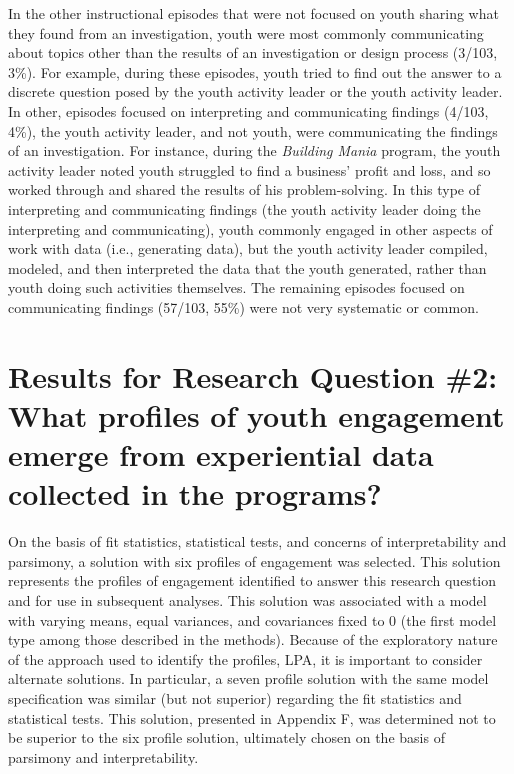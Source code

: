 \documentclass[]{msu-thesis}
\theoremstyle{definition}
\theoremstyle{definition}
\theoremstyle{definition}
\theoremstyle{remark}
\begin{document}
In the other instructional episodes that were not focused on youth
sharing what they found from an investigation, youth were most commonly
communicating about topics other than the results of an investigation or
design process (3/103, 3\%). For example, during these episodes, youth
tried to find out the answer to a discrete question posed by the youth
activity leader or the youth activity leader. In other, episodes focused
on interpreting and communicating findings (4/103, 4\%), the youth
activity leader, and not youth, were communicating the findings of an
investigation. For instance, during the \emph{Building Mania} program,
the youth activity leader noted youth struggled to find a business'
profit and loss, and so worked through and shared the results of his
problem-solving. In this type of interpreting and communicating findings
(the youth activity leader doing the interpreting and communicating),
youth commonly engaged in other aspects of work with data (i.e.,
generating data), but the youth activity leader compiled, modeled, and
then interpreted the data that the youth generated, rather than youth
doing such activities themselves. The remaining episodes focused on
communicating findings (57/103, 55\%) were not very systematic or
common.

\section{Results for Research Question \#2: What profiles of youth
engagement emerge from experiential data collected in the
programs?}\label{results-for-research-question-2-what-profiles-of-youth-engagement-emerge-from-experiential-data-collected-in-the-programs}

On the basis of fit statistics, statistical tests, and concerns of
interpretability and parsimony, a solution with six profiles of
engagement was selected. This solution represents the profiles of
engagement identified to answer this research question and for use in
subsequent analyses. This solution was associated with a model with
varying means, equal variances, and covariances fixed to 0 (the first
model type among those described in the methods). Because of the
exploratory nature of the approach used to identify the profiles, LPA,
it is important to consider alternate solutions. In particular, a seven
profile solution with the same model specification was similar (but not
superior) regarding the fit statistics and statistical tests. This
solution, presented in Appendix F, was determined not to be superior to
the six profile solution, ultimately chosen on the basis of parsimony
and interpretability.
\end{document}
